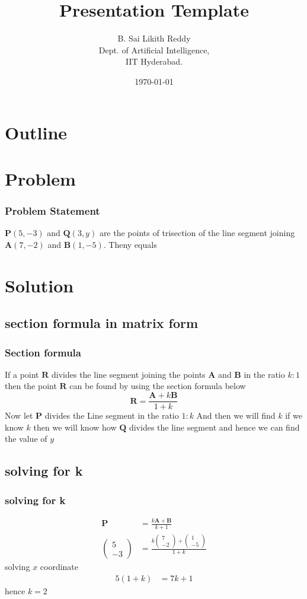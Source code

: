 \documentclass{beamer}
\title{Presentation Template}
\author{B. Sai Likith Reddy \\ Dept. of Artificial Intelligence,\\IIT Hyderabad.}
\date{\today}
\providecommand{\brak}[1]{\ensuremath{\left(#1\right)}}
\theoremstyle{remark}
\newcommand{\myvec}[1]{\ensuremath{\begin{pmatrix}#1\end{pmatrix}}}
\let\vec\mathbf
\numberwithin{equation}{section}
\begin{document}
\begin{frame}
\titlepage
\end{frame}

\section*{Outline}
\begin{frame}
\tableofcontents
\end{frame}
\section{Problem}
\begin{frame}
\frametitle{Problem Statement}
%
 $\vec{P}\brak{5,-3}$ and $\vec{Q}\brak{3,y}$ are the points of trisection of the line segment joining $\vec{A}\brak{7,-2}$ and $\vec{B}\brak{1,-5}$. Theny equals

\end{frame}

\section{Solution}
\subsection{section formula in matrix form}
\begin{frame}
\frametitle{Section formula}
If a point $\vec{R}$ divides the line segment joining the points $\vec{A}$ and $\vec{B}$ in the ratio $k:1$ then the point $\vec{R}$ can be found by using the section formula below
$$\vec{R}=\frac{\vec{A}+k\vec{B}}{1+k}$$
Now let $\vec{P}$ divides the Line segment in the ratio $1:k$ And then we will find $k$ if we know $k$ then we will know how $\vec{Q}$ divides the line segment and hence we can find the value of $y$
\end{frame}
\subsection{solving for k}
\begin{frame}
\frametitle{solving for k}
\begin{align}
\vec{P}&=\frac{k\vec{A}+\vec{B}}{k+1}\\
\myvec{5\\-3}&=\frac{k\myvec{7\\-2}+\myvec{1\\-5}}{1+k}
\end{align}
solving $x$ coordinate
\begin {align}
5\brak{1+k}&=7k+1
\end{align}
hence $k=2$
\end{frame}
\end{document}
